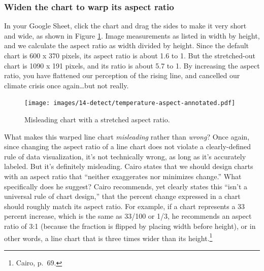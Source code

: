 \documentclass[
  english,
]{book}
\begin{document}
\hypertarget{widen-the-chart-to-warp-its-aspect-ratio}{%
\subsubsection*{Widen the chart to warp its aspect ratio}\label{widen-the-chart-to-warp-its-aspect-ratio}}

In your Google Sheet, click the chart and drag the sides to make it very short and wide, as shown in Figure \ref{fig:temperature-aspect-annotated}. Image measurements as listed in width by height, and we calculate the aspect ratio as width divided by height. Since the default chart is 600 x 370 pixels, its aspect ratio is about 1.6 to 1. But the stretched-out chart is 1090 x 191 pixels, and its ratio is about 5.7 to 1. By increasing the aspect ratio, you have flattened our perception of the rising line, and cancelled our climate crisis once again\ldots but not really.



\begin{figure}
\centering
\texttt{[image: images/14-detect/temperature-aspect-annotated.pdf]}
\caption{\label{fig:temperature-aspect-annotated}Misleading chart with a stretched aspect ratio.}
\end{figure}

What makes this warped line chart \emph{misleading} rather than \emph{wrong}? Once again, since changing the aspect ratio of a line chart does not violate a clearly-defined rule of data visualization, it's not technically wrong, as long as it's accurately labeled. But it's definitely misleading. Cairo states that we should design charts with an aspect ratio that ``neither exaggerates nor minimizes change.'' What specifically does he suggest? Cairo recommends, yet clearly states this ``isn't a universal rule of chart design,'' that the percent change expressed in a chart should roughly match its aspect ratio. For example, if a chart represents a 33 percent increase, which is the same as 33/100 or 1/3, he recommends an aspect ratio of 3:1 (because the fraction is flipped by placing width before height), or in other words, a line chart that is three times wider than its height.\footnote{Cairo{}, p.~69.}
\end{document}

